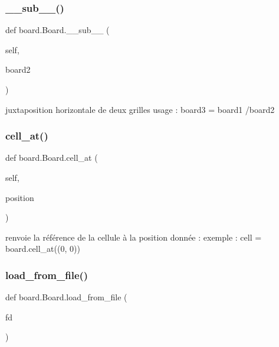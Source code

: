 \subsubsection{\texorpdfstring{\+\_\+\+\_\+sub\+\_\+\+\_\+()}{\_\_sub\_\_()}}
{\footnotesize\ttfamily def board.\+Board.\+\_\+\+\_\+sub\+\_\+\+\_\+ (\begin{DoxyParamCaption}\item[{}]{self,  }\item[{}]{board2 }\end{DoxyParamCaption})}

\begin{DoxyVerb}juxtaposition horizontale de deux grilles 
usage :
board3 = board1 /board2\end{DoxyVerb}
 \mbox{\label{classboard_1_1Board_a8cf058b5192a359f7312cd7c3fe11035}} 
\subsubsection{\texorpdfstring{cell\+\_\+at()}{cell\_at()}}
{\footnotesize\ttfamily def board.\+Board.\+cell\+\_\+at (\begin{DoxyParamCaption}\item[{}]{self,  }\item[{}]{position }\end{DoxyParamCaption})}

\begin{DoxyVerb}renvoie la référence de la cellule à la position donnée :
 exemple : cell = board.cell_at((0, 0))
\end{DoxyVerb}
 \mbox{\label{classboard_1_1Board_a9091b4a3885f23c5177caa1b39f8abcd}} 
\subsubsection{\texorpdfstring{load\+\_\+from\+\_\+file()}{load\_from\_file()}}
{\footnotesize\ttfamily def board.\+Board.\+load\+\_\+from\+\_\+file (\begin{DoxyParamCaption}\item[{}]{fd }\end{DoxyParamCaption})\hspace{0.3cm}{\ttfamily [static]}}

